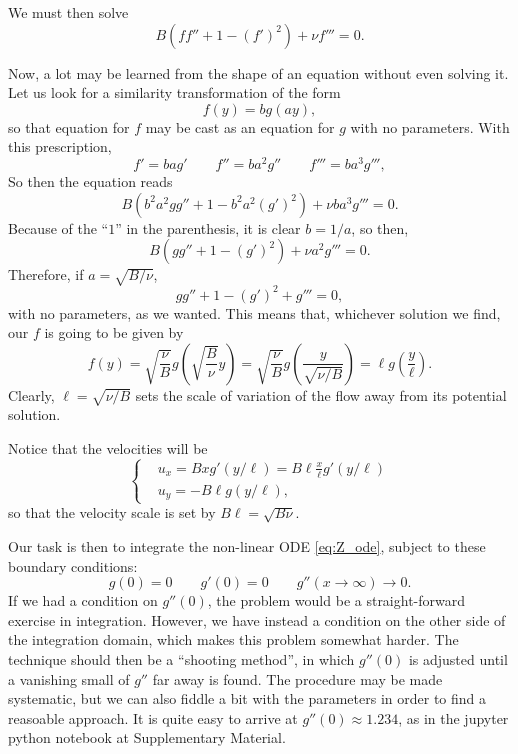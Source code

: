 We must then solve
\[
 B \left(  f f'' + 1-  (f')^2 \right) + \nu f''' = 0 .
\]

Now, a lot may be learned from the shape of an equation without even
solving it. Let us look for a similarity transformation of the
form
\[
f(y) = b g(a y) ,
\]
so that equation for $f$ may be cast as an equation for $g$ with no
parameters. With this prescription,
\[
f' = ba g' \qquad f''=b a^2 g'' \qquad f'''= b a^3 g''' ,
\]
So then the equation reads
\[
 B \left(  b^2 a^2 g g'' + 1-  b^2 a^2 (g')^2 \right) + \nu b a^3  g''' = 0 .
\]
Because of the ``$1$'' in the parenthesis, it is clear $b=1/a$, so then,
\[
 B \left(  g g'' + 1-  (g')^2 \right) + \nu  a^2  g''' = 0 .
\]
Therefore, if $a=\sqrt{B/\nu}$,
\begin{equation}
  \label{eq:Z_ode}
  g g'' + 1-  (g')^2  +  g''' = 0 ,
\end{equation}
with no parameters, as we wanted. This means that, whichever solution
we find, our $f$ is going to be given by
\[
f(y) = \sqrt{\frac{\nu}{B}} g\left(\sqrt{\frac{B}{\nu}}  y  \right) =
\sqrt{\frac{\nu}{B}} g\left(\frac{y}{ \sqrt{\nu/B} } \right) =
 \ell g\left(\frac{y}{ \ell } \right) .
\]
Clearly, $\ell = \sqrt{\nu/B} $ sets the scale of variation of the
flow away from its potential solution.

Notice that the velocities will be
\[
\begin{cases}
  & u_x =   B x g'(y/\ell) = B\ell \frac{x}{\ell} g'(y/\ell)  \\
  & u_y = - B \ell g(y/\ell)  ,
\end{cases}
\]
so that the velocity scale is set by $B\ell=\sqrt{B\nu}$.





Our task is then to integrate the non-linear ODE \ref{eq:Z_ode}, subject
to these boundary conditions:
\[
g(0)=0 \qquad g'(0)=0 \qquad g''(x\to \infty) \to 0 .
\]
If we had a condition on $g''(0)$, the problem would be a
straight-forward exercise in integration. However, we have instead a
condition on the other side of the integration domain, which makes
this problem somewhat harder. The technique should then be a
``shooting method'', in which $g''(0)$ is adjusted until a vanishing
small of $g''$ far away is found. The procedure may be made
systematic, but we can also fiddle a bit with the parameters in order
to find a reasoable approach. It is quite easy to arrive at
$g''(0)\approx 1.234$, as in the jupyter python notebook at
Supplementary Material.

